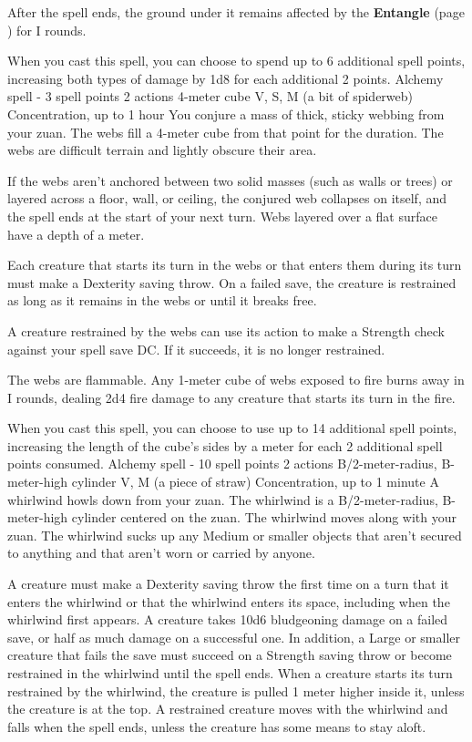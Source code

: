     After the spell ends, the ground under it remains affected by the \textbf{Entangle} (page \pageref{spell::entangle}) for I rounds.

    When you cast this spell, you can choose to spend up to 6 additional spell points, increasing both types of damage by 1d8 for each additional 2 points.
    {Alchemy spell - 3 spell points}
    {2 actions}
    {4-meter cube}
    {V, S, M (a bit of spiderweb)}
    {Concentration, up to 1 hour}
    You conjure a mass of thick, sticky webbing from your zuan.
    The webs fill a 4-meter cube from that point for the duration.
    The webs are difficult terrain and lightly obscure their area.

    If the webs aren't anchored between two solid masses (such as walls or trees) or layered across a floor, wall, or ceiling, the conjured web collapses on itself, and the spell ends at the start of your next turn.
    Webs layered over a flat surface have a depth of a meter.

    Each creature that starts its turn in the webs or that enters them during its turn must make a Dexterity saving throw.
    On a failed save, the creature is restrained as long as it remains in the webs or until it breaks free.

    A creature restrained by the webs can use its action to make a Strength check against your spell save DC.
    If it succeeds, it is no longer restrained.

    The webs are flammable.
    Any 1-meter cube of webs exposed to fire burns away in I rounds, dealing 2d4 fire damage to any creature that starts its turn in the fire.

    When you cast this spell, you can choose to use up to 14 additional spell points, increasing the length of the cube's sides by a meter for each 2 additional spell points consumed.
    {Alchemy spell - 10 spell points}
    {2 actions}
    {B/2-meter-radius, B-meter-high cylinder}
    {V, M (a piece of straw)}
    {Concentration, up to 1 minute}
    A whirlwind howls down from your zuan.
    The whirlwind is a B/2-meter-radius, B-meter-high cylinder centered on the zuan.
    The whirlwind moves along with your zuan.
    The whirlwind sucks up any Medium or smaller objects that aren't secured to anything and that aren't worn or carried by anyone.

    A creature must make a Dexterity saving throw the first time on a turn that it enters the whirlwind or that the whirlwind enters its space, including when the whirlwind first appears.
    A creature takes 10d6 bludgeoning damage on a failed save, or half as much damage on a successful one.
    In addition, a Large or smaller creature that fails the save must succeed on a Strength saving throw or become restrained in the whirlwind until the spell ends.
    When a creature starts its turn restrained by the whirlwind, the creature is pulled 1 meter higher inside it, unless the creature is at the top.
    A restrained creature moves with the whirlwind and falls when the spell ends, unless the creature has some means to stay aloft.

